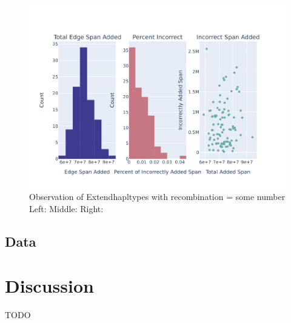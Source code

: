 \documentclass[10pt,twoside,lineno]{gsajnl}
\begin{document}
\begin{figure}
	\includegraphics[width=0.9\linewidth]{newplots_wo_ee/sampling_dist_recomb.pdf}
	\caption{Observation of Extendhapltypes with recombination = some number
		Left: 
		Middle:
		Right: }
\end{figure}

\subsection{Data}



\section{Discussion}

TODO



\appendix
%
\end{document}
